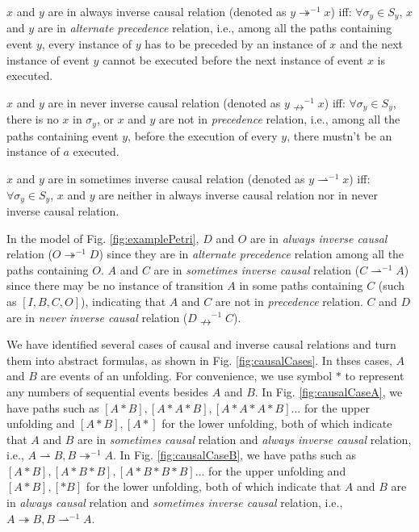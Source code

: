 \documentclass{llncs}
\begin{document}
\begin{definition}\label{def:alwaysInverseCausal}
$x$ and $y$ are in always inverse causal relation (denoted as $y\twoheadrightarrow^{-1}x$) iff: $\forall\sigma_{y}\in S_{y}$, $x$ and $y$ are in \textit{alternate precedence} relation, i.e., among all the paths containing event $y$, every instance of $y$ has to be preceded by an instance of $x$ and the next instance of event $y$ cannot be executed before the next instance of event $x$ is executed.
\end{definition}

\begin{definition}\label{def:neverInverseCausal}
$x$ and $y$ are in never inverse causal relation (denoted as $y\nrightarrow^{-1}x$) iff: $\forall\sigma_{y}\in S_{y}$, there is no $x$ in $\sigma_{y}$, or $x$ and $y$ are not in \textit{precedence} relation, i.e., among all the paths containing event $y$, before the execution of every $y$, there mustn't be an instance of $a$ executed.
\end{definition}

\begin{definition}\label{def:sometimesInverseCausal}
$x$ and $y$ are in sometimes inverse causal relation (denoted as $y\rightharpoonup^{-1}x$) iff: $\forall\sigma_{y}\in S_{y}$, $x$ and $y$ are neither in always inverse causal relation nor in never inverse causal relation.
\end{definition}

\begin{example}
In the model of Fig. \ref{fig:examplePetri}, $D$ and $O$ are in \textit{always inverse causal} relation ($O\twoheadrightarrow^{-1}D$) since they are in \textit{alternate precedence} relation among all the paths containing $O$. $A$ and $C$ are in \textit{sometimes inverse causal} relation ($C\rightharpoonup^{-1}A$) since there may be no instance of transition $A$ in some paths containing $C$ (such as $[I,B,C,O]$), indicating that $A$ and $C$ are not in \textit{precedence} relation. $C$ and $D$ are in \textit{never inverse causal} relation ($D\nrightarrow^{-1}C$).
\end{example}

We have identified several cases of causal and inverse causal relations and turn them into abstract formulas, as shown in Fig. \ref{fig:causalCases}. In thses cases, $A$ and $B$ are events of an unfolding. For convenience, we use symbol $*$ to represent any numbers of sequential events besides $A$ and $B$. In Fig. \ref{fig:causalCaseA}, we have paths such as $[A*B],[A*A*B],[A*A*A*B]...$ for the upper unfolding and $[A*B],[A*]$ for the lower unfolding, both of which indicate that $A$ and $B$ are in \textit{sometimes causal} relation and \textit{always inverse causal} relation, i.e., $A\rightharpoonup B,B\twoheadrightarrow^{-1}A$. In Fig. \ref{fig:causalCaseB}, we have paths such as $[A*B],[A*B*B],[A*B*B*B]...$ for the upper unfolding and $[A*B],[*B]$ for the lower unfolding, both of which indicate that $A$ and $B$ are in \textit{always causal} relation and \textit{sometimes inverse causal} relation, i.e., $A\twoheadrightarrow B,B\rightharpoonup^{-1}A$.
\end{document}
